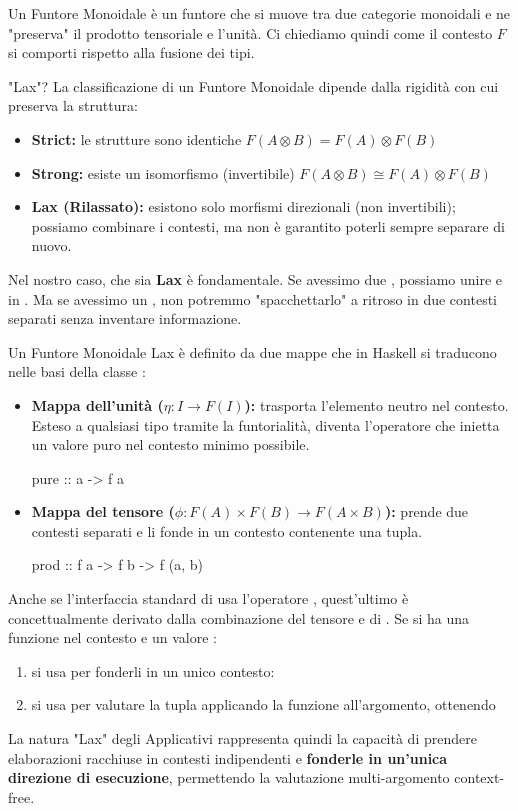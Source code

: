 Un Funtore Monoidale è un funtore che si muove tra due categorie monoidali e ne "preserva" il prodotto tensoriale e l'unità. Ci chiediamo quindi come il contesto $F$ si comporti rispetto alla fusione dei tipi.

\begin{gframe}{"Lax"?}
    La classificazione di un Funtore Monoidale dipende dalla rigidità con cui preserva la struttura:
    \begin{itemize}
        \item \textbf{Strict:} le strutture sono identiche $F(A \otimes B) = F(A) \otimes F(B)$
        \item \textbf{Strong:} esiste un isomorfismo (invertibile) $F(A \otimes B) \cong F(A) \otimes F(B)$
        \item \textbf{Lax (Rilassato):} esistono solo morfismi direzionali (non invertibili); possiamo combinare i contesti, ma non è garantito poterli sempre separare di nuovo.
    \end{itemize}
    Nel nostro caso, che sia \textbf{Lax} è fondamentale. Se avessimo due , possiamo unire  e  in . Ma se avessimo un , non potremmo "spacchettarlo" a ritroso in due contesti separati senza inventare informazione.
\end{gframe}

Un Funtore Monoidale Lax è definito da due mappe che in Haskell si traducono nelle basi della classe :

\begin{itemize}
    \item \textbf{Mappa dell'unità ($\eta : I \to F(I)$):} trasporta l'elemento neutro nel contesto. Esteso a qualsiasi tipo tramite la funtorialità, diventa l'operatore che inietta un valore puro nel contesto minimo possibile.
\begin{haskellbox}{}
pure :: a -> f a
\end{haskellbox}

    \item \textbf{Mappa del tensore ($\phi : F(A) \times F(B) \to F(A \times B)$):} prende due contesti separati e li fonde in un contesto contenente una tupla.
\begin{haskellbox}{}
prod :: f a -> f b -> f (a, b)
\end{haskellbox}
\end{itemize}

Anche se l'interfaccia standard di  usa l'operatore \code{<*>}, quest'ultimo è concettualmente derivato dalla combinazione del tensore  e di . Se si ha una funzione nel contesto  e un valore :
\begin{enumerate}
    \item si usa  per fonderli in un unico contesto: 
    \item si usa  per valutare la tupla applicando la funzione all'argomento, ottenendo 
\end{enumerate}

La natura "Lax" degli Applicativi rappresenta quindi la capacità di prendere elaborazioni racchiuse in contesti indipendenti e \textbf{fonderle in un'unica direzione di esecuzione}, permettendo la valutazione multi-argomento context-free.
